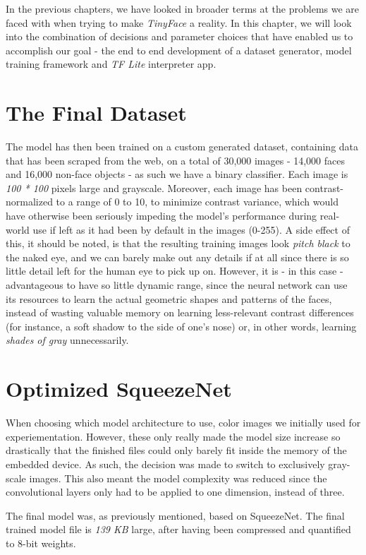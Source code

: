 In the previous chapters, we have looked in broader terms at the problems we are faced with when trying to make \textit{TinyFace} a reality. In this chapter, we will look into the combination of decisions and parameter choices that have enabled us to accomplish our goal - the end to end development of a dataset generator, model training framework and \textit{TF Lite} interpreter app.

\section{The Final Dataset}
The model has then been trained on a custom generated dataset, containing data that has been scraped from the web, on a total of 30,000 images - 14,000 faces and 16,000 non-face objects - as such we have a binary classifier. Each image is \textit{100 * 100} pixels large and grayscale. Moreover, each image has been contrast-normalized to a range of 0 to 10, to minimize contrast variance, which would have otherwise been seriously impeding the model's performance during real-world use if left as it had been by default in the images (0-255). A side effect of this, it should be noted, is that the resulting training images look \textit{pitch black} to the naked eye, and we can barely make out any details if at all since there is so little detail left for the human eye to pick up on. However, it is - in this case - advantageous to have so little dynamic range, since the neural network can use its resources to learn the actual geometric shapes and patterns of the faces, instead of wasting valuable memory on learning less-relevant contrast differences (for instance, a soft shadow to the side of one's nose) or, in other words, learning \textit{shades of gray} unnecessarily. \par

\section{Optimized SqueezeNet}
When choosing which model architecture to use, color images we initially used for experiementation. However, these only really made the model size increase so drastically that the finished files could only barely fit inside the memory of the embedded device. As such, the decision was made to switch to exclusively gray-scale images. This also meant the model complexity was reduced since the convolutional layers only had to be applied to one dimension, instead of three. \par
The final model was, as previously mentioned, based on SqueezeNet. The final trained model file is \textit{139 KB} large, after having been compressed and quantified to 8-bit weights. \par
